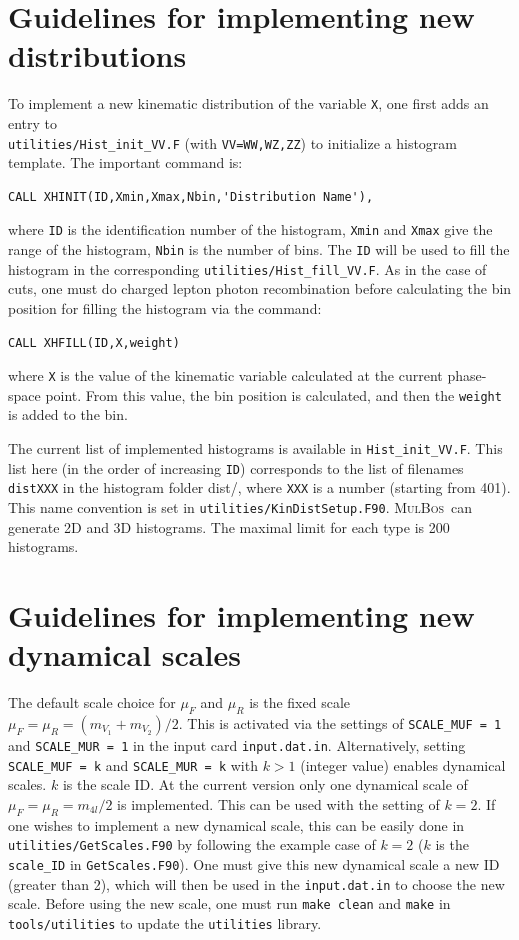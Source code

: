 \documentclass[english,12pt]{article}
\newcommand{\mulbos}{\textsc{MulBos}}
\begin{document}
\section{Guidelines for implementing new distributions}
\label{sec:dists}
To implement a new kinematic distribution of the variable {\tt X}, one first adds an entry to \\
{\tt utilities/Hist\_init\_VV.F} (with {\tt VV=WW,WZ,ZZ})
to initialize a histogram template. 
The important command is:
\begin{verbatim}
CALL XHINIT(ID,Xmin,Xmax,Nbin,'Distribution Name'),
\end{verbatim}
where {\tt ID} is the identification number of the histogram, {\tt Xmin} and {\tt Xmax} give the range of the histogram, 
{\tt Nbin} is the number of bins. 
The {\tt ID} will be used to fill the histogram in the corresponding {\tt utilities/Hist\_fill\_VV.F}. 
As in the case of cuts, one must do charged lepton photon recombination before calculating the bin position for 
filling the histogram via the command:
\begin{verbatim}
CALL XHFILL(ID,X,weight)
\end{verbatim}
where {\tt X} is the value of the kinematic variable calculated at the current phase-space point. From this value, the bin position is 
calculated, and then the {\tt weight} is added to the bin. 

The current list of implemented histograms is available in {\tt Hist\_init\_VV.F}. This list here (in the order of increasing {\tt ID}) 
corresponds to the list of filenames {\tt distXXX} in the histogram folder {dist/}, where {\tt XXX} is a number (starting from 401). 
This name convention is set in {\tt utilities/KinDistSetup.F90}. \mulbos\ can generate 2D and 3D histograms. The maximal limit for each type is 200 histograms. 
\section{Guidelines for implementing new dynamical scales}
\label{sec:scales}
The default scale choice for $\mu_F$ and $\mu_R$ is the fixed scale $\mu_F = \mu_R = (m_{V_1} + m_{V_2})/2$. 
This is activated via the settings of {\tt SCALE\_MUF = 1} and {\tt SCALE\_MUR = 1} 
in the input card {\tt input.dat.in}. 
Alternatively, setting {\tt SCALE\_MUF = k} and {\tt SCALE\_MUR = k} with $k>1$ (integer value) enables dynamical scales. 
$k$ is the scale ID. 
At the current version only one dynamical scale of $\mu_F = \mu_R = m_{4l}/2$ is implemented. 
This can be used with the setting of $k=2$.  
If one wishes to implement a new dynamical scale, this can be easily done in {\tt utilities/GetScales.F90} by 
following the example case of $k=2$ ($k$ is the {\tt scale\_ID} in {\tt GetScales.F90}). 
One must give this new dynamical scale a new ID (greater than 2), which will then be used in the {\tt input.dat.in} to choose 
the new scale. Before using the new scale, one must run {\tt make clean} and {\tt make} in {\tt tools/utilities} to update the {\tt utilities} library. 
\end{document}
